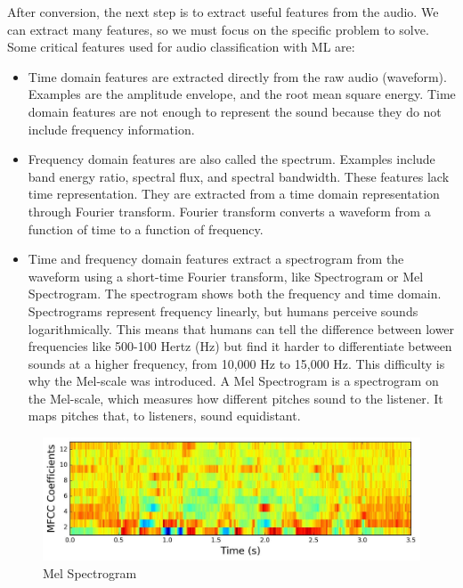 \documentclass[11pt]{article}
\begin{document}
After conversion, the next step is to extract useful features from the audio. We can extract many features, so we must focus on the specific problem to solve. Some critical features used for audio classification with ML are:

\begin{itemize}


  \item Time domain features are extracted directly from the raw audio (waveform). Examples are the amplitude envelope, and the root mean square energy. Time domain features are not enough to represent the sound because they do not include frequency information.

  \item Frequency domain features are also called the spectrum. Examples include band energy ratio, spectral flux, and spectral bandwidth. These features lack time representation. They are extracted from a time domain representation through Fourier transform. Fourier transform converts a waveform from a function of time to a function of frequency.

  \item Time and frequency domain features extract a spectrogram from the waveform using a short-time Fourier transform, like Spectrogram or Mel Spectrogram. The spectrogram shows both the frequency and time domain. Spectrograms represent frequency linearly, but humans perceive sounds logarithmically. This means that humans can tell the difference between lower frequencies like 500-100 Hertz (Hz) but find it harder to differentiate between sounds at a higher frequency, from 10,000 Hz to 15,000 Hz. This difficulty is why the Mel-scale was introduced. A Mel Spectrogram is a spectrogram on the Mel-scale, which measures how different pitches sound to the listener. It maps pitches that, to listeners, sound equidistant.
\end{itemize}


\begin{figure}[h]
  \centering
  \begin{minipage}{1\textwidth}
    \centering
    \includegraphics[width=1\textwidth]{image/spectro.jpg}
    \caption{Mel Spectrogram}
  \end{minipage}\hfill
\end{figure}
\end{document}
